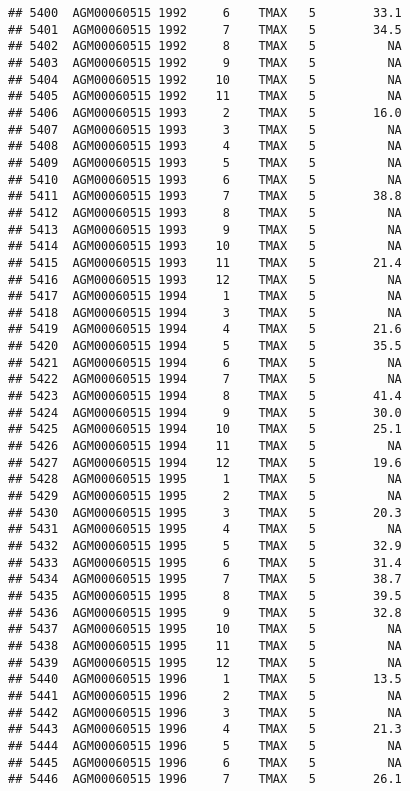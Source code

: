 \documentclass{article}\usepackage[]{graphicx}\usepackage[]{color}
\makeatletter
\newenvironment{kframe}{%
 \def\at@end@of@kframe{}%
 \ifinner\ifhmode%
  \def\at@end@of@kframe{\end{minipage}}%
  \begin{minipage}{\columnwidth}%
 \fi\fi%
 \def\FrameCommand##1{\hskip\@totalleftmargin \hskip-\fboxsep
 \colorbox{shadecolor}{##1}\hskip-\fboxsep
     \hskip-\linewidth \hskip-\@totalleftmargin \hskip\columnwidth}%
 \MakeFramed {\advance\hsize-\width
   \@totalleftmargin\z@ \linewidth\hsize
   \@setminipage}}%
 {\par\unskip\endMakeFramed%
 \at@end@of@kframe}
\newenvironment{knitrout}{}{} %
\makeatother
\begin{document}
\begin{knitrout}
\begin{kframe}
\begin{verbatim}
## 5400  AGM00060515 1992     6    TMAX   5        33.1
## 5401  AGM00060515 1992     7    TMAX   5        34.5
## 5402  AGM00060515 1992     8    TMAX   5          NA
## 5403  AGM00060515 1992     9    TMAX   5          NA
## 5404  AGM00060515 1992    10    TMAX   5          NA
## 5405  AGM00060515 1992    11    TMAX   5          NA
## 5406  AGM00060515 1993     2    TMAX   5        16.0
## 5407  AGM00060515 1993     3    TMAX   5          NA
## 5408  AGM00060515 1993     4    TMAX   5          NA
## 5409  AGM00060515 1993     5    TMAX   5          NA
## 5410  AGM00060515 1993     6    TMAX   5          NA
## 5411  AGM00060515 1993     7    TMAX   5        38.8
## 5412  AGM00060515 1993     8    TMAX   5          NA
## 5413  AGM00060515 1993     9    TMAX   5          NA
## 5414  AGM00060515 1993    10    TMAX   5          NA
## 5415  AGM00060515 1993    11    TMAX   5        21.4
## 5416  AGM00060515 1993    12    TMAX   5          NA
## 5417  AGM00060515 1994     1    TMAX   5          NA
## 5418  AGM00060515 1994     3    TMAX   5          NA
## 5419  AGM00060515 1994     4    TMAX   5        21.6
## 5420  AGM00060515 1994     5    TMAX   5        35.5
## 5421  AGM00060515 1994     6    TMAX   5          NA
## 5422  AGM00060515 1994     7    TMAX   5          NA
## 5423  AGM00060515 1994     8    TMAX   5        41.4
## 5424  AGM00060515 1994     9    TMAX   5        30.0
## 5425  AGM00060515 1994    10    TMAX   5        25.1
## 5426  AGM00060515 1994    11    TMAX   5          NA
## 5427  AGM00060515 1994    12    TMAX   5        19.6
## 5428  AGM00060515 1995     1    TMAX   5          NA
## 5429  AGM00060515 1995     2    TMAX   5          NA
## 5430  AGM00060515 1995     3    TMAX   5        20.3
## 5431  AGM00060515 1995     4    TMAX   5          NA
## 5432  AGM00060515 1995     5    TMAX   5        32.9
## 5433  AGM00060515 1995     6    TMAX   5        31.4
## 5434  AGM00060515 1995     7    TMAX   5        38.7
## 5435  AGM00060515 1995     8    TMAX   5        39.5
## 5436  AGM00060515 1995     9    TMAX   5        32.8
## 5437  AGM00060515 1995    10    TMAX   5          NA
## 5438  AGM00060515 1995    11    TMAX   5          NA
## 5439  AGM00060515 1995    12    TMAX   5          NA
## 5440  AGM00060515 1996     1    TMAX   5        13.5
## 5441  AGM00060515 1996     2    TMAX   5          NA
## 5442  AGM00060515 1996     3    TMAX   5          NA
## 5443  AGM00060515 1996     4    TMAX   5        21.3
## 5444  AGM00060515 1996     5    TMAX   5          NA
## 5445  AGM00060515 1996     6    TMAX   5          NA
## 5446  AGM00060515 1996     7    TMAX   5        26.1

\end{verbatim}
\end{kframe}
\end{knitrout}
\end{document}
